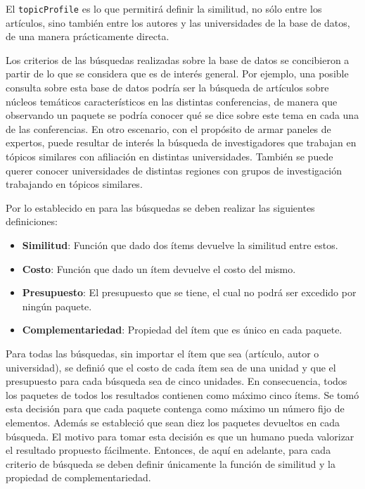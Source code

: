 El \texttt{topicProfile} es lo que permitirá definir la similitud, no sólo entre los artículos, sino también entre los autores y las universidades de la base de datos, de una manera prácticamente directa.

Los criterios de las búsquedas realizadas sobre la base de datos se concibieron a partir de lo que se considera que es de interés general. Por ejemplo, una posible consulta sobre esta base de datos podría ser la búsqueda de artículos sobre núcleos temáticos característicos en las distintas conferencias, de manera que observando un paquete se podría conocer qué se dice sobre este tema en cada una de las conferencias. En otro escenario, con el propósito de armar paneles de expertos, puede resultar de interés la búsqueda de investigadores que trabajan en tópicos similares con afiliación en distintas universidades. También se puede querer conocer universidades de distintas regiones con grupos de investigación trabajando en tópicos similares.

Por lo establecido en \cite{journals/tkde/Amer-YahiaBCFMZ14} para las búsquedas se deben realizar las siguientes definiciones:
\begin{itemize}
  \item \textbf{Similitud}: Función que dado dos ítems devuelve la similitud entre estos.
  \item \textbf{Costo}: Función que dado un ítem devuelve el costo del mismo.
  \item \textbf{Presupuesto}: El presupuesto que se tiene, el cual no podrá ser excedido por ningún paquete.
  \item \textbf{Complementariedad}: Propiedad del ítem que es único en cada paquete.
\end{itemize}

Para todas las búsquedas, sin importar el ítem que sea (artículo, autor o universidad), se definió que el costo de cada ítem sea de una unidad y que el presupuesto para cada búsqueda sea de cinco unidades. En consecuencia, todos los paquetes de todos los resultados contienen como máximo cinco ítems. Se tomó esta decisión para que cada paquete contenga como máximo un número fijo de elementos. Además se estableció que sean diez los paquetes devueltos en cada búsqueda. El motivo para tomar esta decisión es que un humano pueda valorizar el resultado propuesto fácilmente. Entonces, de aquí en adelante, para cada criterio de búsqueda se deben definir únicamente la función de similitud y la propiedad de complementariedad.

